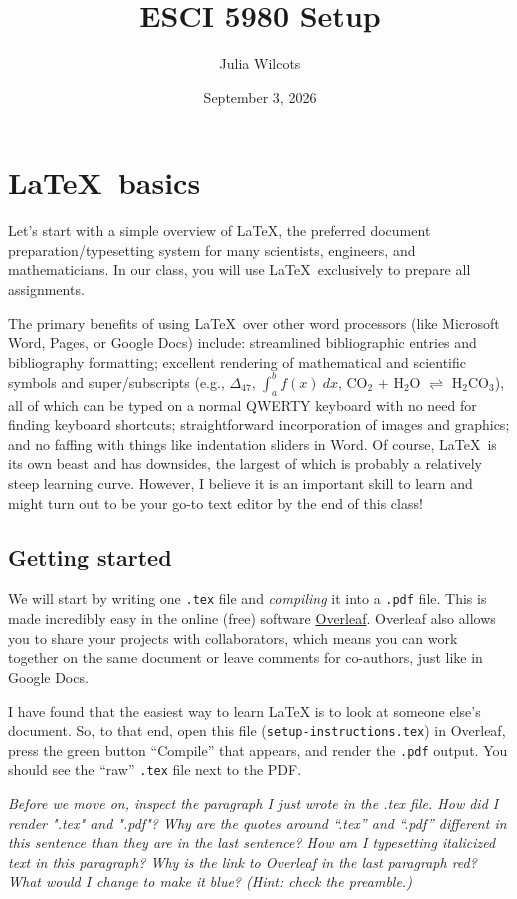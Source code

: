 \documentclass{article} %
\title{ESCI 5980 Setup}
\author{Julia Wilcots}
\date{September 3, 2026}
\begin{document}
\maketitle %

\section{\LaTeX~basics}
Let's start with a simple overview of \LaTeX, the preferred document preparation/typesetting system for many scientists, engineers, and mathematicians. In our class, you will use \LaTeX~exclusively to prepare all assignments.

The primary benefits of using \LaTeX~over other word processors (like Microsoft Word, Pages, or Google Docs) include: streamlined bibliographic entries and bibliography formatting; excellent rendering of mathematical and scientific symbols and super/subscripts (e.g., $\Delta_{47}$, $\int_a^bf(x)~dx$, CO$_2$ + H$_2$O $\rightleftharpoons$ H$_2$CO$_3$), all of which can be typed on a normal QWERTY keyboard with no need for finding keyboard shortcuts; straightforward incorporation of images and graphics; and no faffing with things like indentation sliders in Word. Of course, \LaTeX~is its own beast and has downsides, the largest of which is probably a relatively steep learning curve. However, I believe it is an important skill to learn and might turn out to be your go-to text editor by the end of this class! 

\subsection{Getting started}
We will start by writing one \texttt{.tex} file and \textit{compiling} it into a \texttt{.pdf} file. This is made incredibly easy in the online (free) software \href{http://www.overleaf.com}{Overleaf}. Overleaf also allows you to share your projects with collaborators, which means you can work together on the same document or leave comments for co-authors, just like in Google Docs. 

I have found that the easiest way to learn LaTeX is to look at someone else's document. So, to that end, open this file (\texttt{setup-instructions.tex}) in Overleaf, press the green button ``Compile'' that appears, and render the \texttt{.pdf} output. You should see the ``raw'' \texttt{.tex} file next to the PDF. 

\textit{Before we move on, inspect the paragraph I just wrote in the .tex file. How did I render ".tex" and ".pdf"? Why are the quotes around ``.tex'' and ``.pdf'' different in this sentence than they are in the last sentence? How am I typesetting italicized text in this paragraph? Why is the link to Overleaf in the last paragraph red? What would I change to make it blue? (Hint: check the preamble.)}
\end{document}
